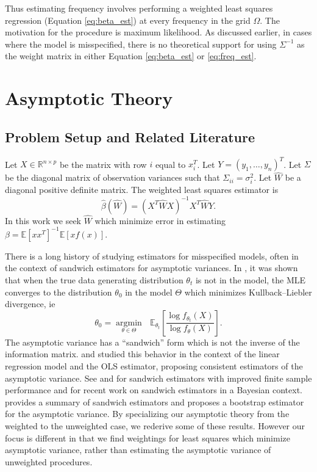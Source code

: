 \documentclass[ejs,ps,preprint]{imsart}
\numberwithin{equation}{section}
\theoremstyle{plain}
\newcommand{\M}[1]{#1} %
\newcommand{\E}{\mathbb{E}}
\newcommand{\argmin}[1]{\underset{#1}{\operatorname{argmin}}\text{ }}
\def\E{\mathbb{E}}
\begin{document}
Thus estimating frequency involves performing a weighted least squares regression (Equation \eqref{eq:beta_est}) at every frequency in the grid $\Omega$. The motivation for the procedure is maximum likelihood. As discussed earlier, in cases where the model is misspecified, there is no theoretical support for using $\M{\Sigma}^{-1}$ as the weight matrix in either Equation \eqref{eq:beta_est} or \eqref{eq:freq_est}.


\section{Asymptotic Theory}
\label{sec:asymp}


\subsection{Problem Setup and Related Literature}

Let $X \in \mathbb{R}^{n \times p}$ be the matrix with row $i$ equal to $x_i^T$. Let $Y=(y_1,\ldots,y_n)^T$. Let $\Sigma$ be the diagonal matrix of observation variances such that $\Sigma_{ii} = \sigma_i^2$. Let $\widehat{W}$ be a diagonal positive definite matrix. The weighted least squares estimator is
\begin{equation*}
\widehat{\beta}(\widehat{W}) = (X^T\widehat{W}X)^{-1}X^T\widehat{W}Y.
\end{equation*}
In this work we seek $\widehat{W}$ which minimize error in estimating $\beta = \E[xx^T]^{-1}\E[xf(x)]$.

There is a long history of studying estimators for misspecified models, often in the context of sandwich estimators for asymptotic variances. In \cite{huber1967behavior}, it was shown that when the true data generating distribution $\theta_t$ is not in the model, the MLE converges to the distribution $\theta_0$ in the model $\Theta$ which minimizes Kullback--Liebler divergence, ie
\begin{equation*}
\theta_0 = \argmin{\theta \in \Theta} \E_{\theta_t}\left[\frac{\log f_{\theta_t}(X)}{\log f_\theta(X)}\right].
\end{equation*}
The asymptotic variance has a ``sandwich'' form which is not the inverse of the information matrix. \cite{white1980heteroskedasticity} and \cite{white1980using} studied this behavior in the context of the linear regression model and the OLS estimator, proposing consistent estimators of the asymptotic variance. See \cite{mackinnon1985some} and \cite{long2000using} for sandwich estimators with improved finite sample performance and \cite{szpiro2010model} for recent work on sandwich estimators in a Bayesian context. \cite{buja2014models} provides a summary of sandwich estimators and proposes a bootstrap estimator for the asymptotic variance. By specializing our asymptotic theory from the weighted to the unweighted case, we rederive some of these results. However our focus is different in that we find weightings for least squares which minimize asymptotic variance, rather than estimating the asymptotic variance of unweighted procedures.
\end{document}
